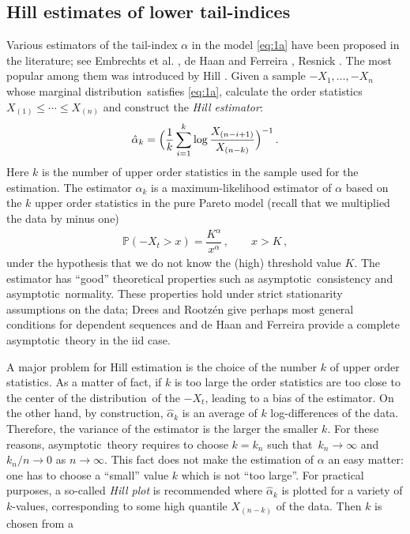 \documentclass[11pt,a4]{amsart}
\newcommand{\asy}{asymptotic}
\newcommand{\beao}{\begin{eqnarray*}}
\newcommand{\eeao}{\end{eqnarray*}\noindent}
\newcommand{\beam}{\begin{eqnarray}}
\newcommand{\eeam}{\end{eqnarray}\noindent}
\newcommand{\nto}{n\to\infty}
\newcommand{\st}{such that}
\newcommand{\ds}{distribution}
\newcommand{\seq}{sequence}
\renewcommand{\P }{{\mathbb P}}
\newcommand{\1}{{\mathbf 1}}
\begin{document}
\subsection{Hill estimates of lower tail-indices}\label{sec:Hill}
Various estimators of the tail-index $\alpha$  in the model
\eqref{eq:1a} have been proposed in the literature;
see Embrechts et al. \cite{embrechts:klueppelberg:mikosch:1997}, de
Haan and Ferreira \cite{haan:ferreira:2006}, Resnick
\cite{resnick:2007}. The most popular among them was introduced  by
Hill \cite{hill1975simple}.
Given a sample $-X_1,\ldots,-X_n$ whose marginal \ds\ satisfies  \eqref{eq:1a}, calculate
the order statistics $X_{(1)}\le \cdots\le X_{(n)}$  and construct the
{\em Hill estimator}:
\beao%
  \hat \alpha_k = \Big(
    {1 \over k} \sum_{i=1}^k \log {X_{(n-i+1)} \over X_{(n-k)}}
    \Big)^{-1}\,.
\eeao
Here $k$  is the number of upper order statistics in the sample used
for the estimation. The estimator $\hat \alpha_k$ is 
a maximum-likelihood estimator of $\alpha$ based on the $k$ upper
order statistics in the pure Pareto model (recall that 
we multiplied the data by minus one)
\beam\label{eq:3}
\P(-X_t>x)= \dfrac{K^\alpha}{x^\alpha}\,,\qquad x>K\,,
\eeam
under the hypothesis that we do not know the (high) threshold value
$K$. The estimator has ``good'' theoretical properties such as 
\asy\ consistency and \asy\ normality. These properties hold under
strict stationarity assumptions on the data; Drees and Rootz\'en 
\cite{drees:rootzen:2010} give perhaps most general conditions for
dependent \seq s and de Haan and Ferreira \cite{haan:ferreira:2006} provide
a complete \asy\ theory in the iid case.
\par
A major problem for Hill estimation is the choice of the number $k$ of
upper order statistics. As  a matter of fact,
if $k$ is too large the order statistics are too close to the center
of the \ds\ of the $-X_t$, leading to a bias
of the estimator. On the other hand, by construction, $\hat \alpha_k$ is an average of $k$ log-differences of the 
data. Therefore, the variance of the estimator is the larger the
smaller $k$. For these reasons, \asy\ theory requires 
to choose $k=k_n$ \st\ $k_n\to\infty$ and $k_n/n\to 0$ as $\nto$. This
fact does not make the estimation of $\alpha$ an  
easy matter: one has to choose a ``small'' value $k$ which is not
``too large''. For practical purposes,
a so-called {\em Hill plot} is recommended where $\hat \alpha_k$ is
plotted for a variety of $k$-values, corresponding to
some high  quantile $X_{(n-k)}$ of the data. Then $k$ is chosen from a
\end{document}

